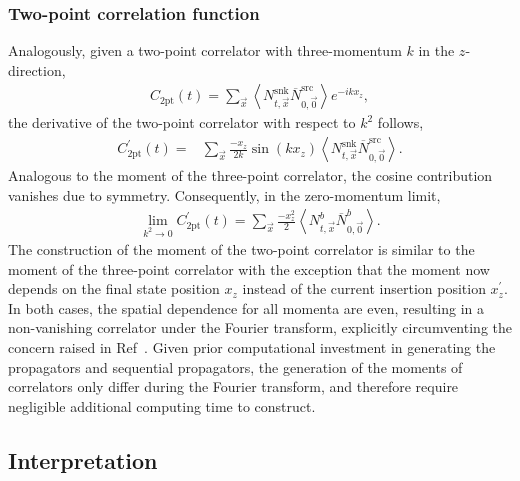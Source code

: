 \documentclass[prd,aps,twocolumn,superscriptaddress,tightenlines,nofootinbib,floatfix,preprintnumbers,10pt]{revtex4-1}
\begin{document}
\subsubsection{Two-point correlation function}
Analogously, given a two-point correlator with three-momentum $k$ in the $z$-direction,
\begin{align}
C_{\text{2pt}}(t) = \sum_{\vec{x}} \left< N^{\mathrm{snk}}_{t,\vec{x}}\overline{N}^{\mathrm{src}}_{0,\vec{0}}\right> e^{-ikx_z},
\label{eq:2pt}
\end{align}
the derivative of the two-point correlator with respect to $k^2$ follows,
\begin{align}
C^\prime_{\text{2pt}}(t)
= & \sum_{\vec{x}}\frac{-x_z}{2k} \sin\left(kx_z\right) \left<N^{\mathrm{snk}}_{t, \vec{x}}\overline{N}^{\mathrm{src}}_{0,\vec{0}} \right>.
\label{eq:2ptmoment}
\end{align}
 Analogous to the moment of the three-point correlator, the cosine contribution vanishes due to symmetry.  Consequently, in the zero-momentum limit,
\begin{align}
\lim_{k^2\rightarrow 0 } C^\prime_{\text{2pt}}(t) = \sum_{\vec{x}} \frac{-x_z^2}{2}\left<N^b_{t, \vec{x}}\overline{N}^b_{0,\vec{0}} \right>.
\label{eq:2ptmoment0}
\end{align}
The construction of the moment of the two-point correlator is similar to the moment of the three-point correlator with the exception that the moment now depends on the final state position $x_z$ instead of the current insertion position $x^\prime_z$. In both cases, the spatial dependence for all momenta are even, resulting in a non-vanishing correlator under the Fourier transform, explicitly circumventing the concern raised in Ref~\cite{Wilcox:2002zt}.  Given prior computational investment in generating the propagators and sequential propagators, the generation of the moments of correlators only differ during the Fourier transform, and therefore require negligible additional computing time to construct.


\subsection{Interpretation}
\end{document}
